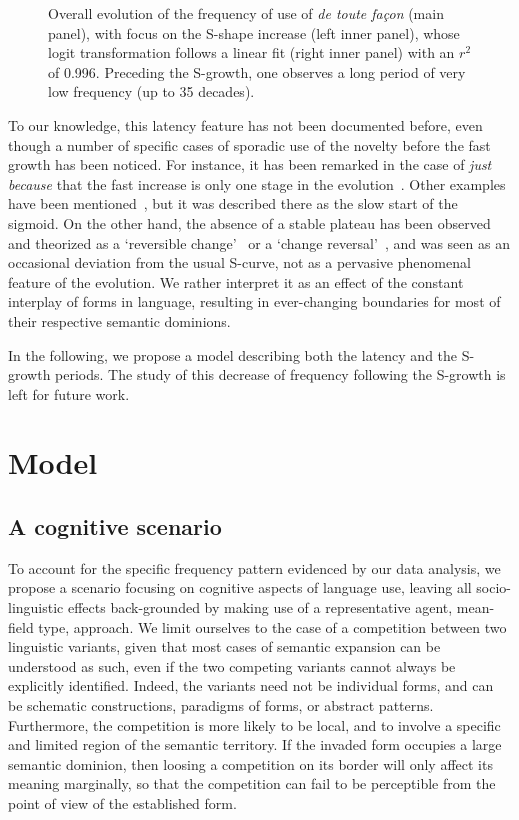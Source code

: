 \documentclass[12pt,twocolumn,amsmath,amssymb,aps,longbibliography]{revtex4-1}  %
\newcommand{\tit}{\textit}
\begin{document}
\begin{figure*}[!tbp]
\caption{\small Overall evolution of the frequency of use of \tit{de toute fa\c con} (main panel), with focus on the S-shape increase (left inner panel), whose logit transformation follows a linear fit (right inner panel) with an $r^2$ of 0.996. Preceding the S-growth, one observes a long period of very low frequency (up to 35 decades).}
\label{fig:star}
\end{figure*}

To our knowledge, this latency feature has not been documented before, even though a number of specific cases of sporadic use of the novelty before the fast growth has been noticed. For instance, it has been remarked in the case of \tit{just because} that the fast increase is only one stage in the evolution~\cite{hilpert2009assessing}. Other examples have been mentioned~\cite{denison2003log}, but it was described there as the slow start of the sigmoid. On the other hand, the absence of a stable plateau has been observed and theorized as a `reversible change'~\cite{best1990methodischer} or a `change reversal'~\cite{nevalainen2015descriptive}, and was seen as an occasional deviation from the usual S-curve, not as a pervasive phenomenal feature of the evolution. We rather interpret it as an effect of the constant interplay of forms in language, resulting in ever-changing boundaries for most of their respective semantic dominions. 

In the following, we propose a model describing both the latency and the S-growth periods. The study of this decrease of frequency following the S-growth is left for future work. 

\section*{Model}

\subsection*{A cognitive scenario}
To account for the specific frequency pattern evidenced by our data analysis, we propose a scenario focusing on cognitive aspects of language use, leaving all socio-linguistic effects back-grounded by making use of a representative agent, mean-field type, approach. We limit ourselves to the case of a competition between two linguistic variants, given that most cases of semantic expansion can be understood as such, even if the two competing variants cannot always be explicitly identified. Indeed, the variants need not be individual forms, and can be schematic constructions, paradigms of forms, or abstract patterns. Furthermore, the competition is more likely to be local, and to involve a specific and limited region of the semantic territory. If the invaded form occupies a large semantic dominion, then loosing a competition on its border will only affect its meaning marginally, so that the competition can fail to be perceptible from the point of view of the established form. 
\end{document}
